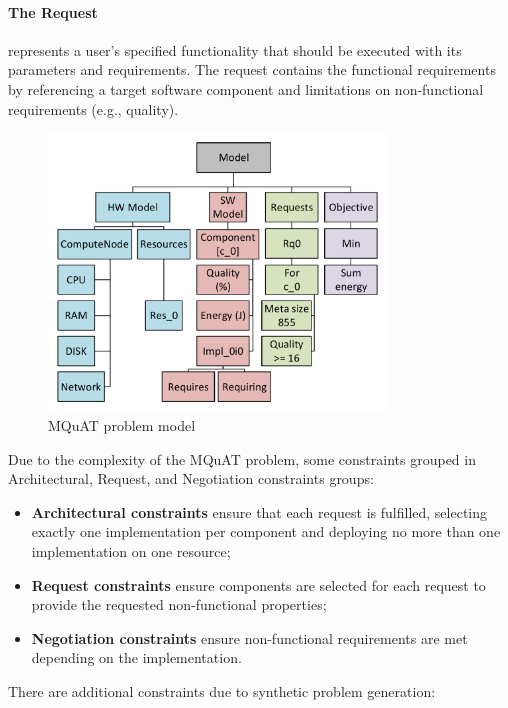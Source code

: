 \paragraph{The Request} represents a user's specified functionality that should be executed with its parameters and requirements.  The request contains the functional requirements by referencing a target software component and limitations on non-functional requirements (e.g., quality).\\


\begin{figure}
	\centering
	\includegraphics[width=0.8\textwidth]{images/MQuATModel.pdf}
	\caption[MQuAT problem model]{MQuAT problem model}
	\label{fig:mquatmodel}
\end{figure}


Due to the complexity of the MQuAT problem, some constraints grouped in Architectural, Request, and Negotiation constraints groups:

\begin{itemize}
	\item \textbf{Architectural constraints} ensure that each request is fulfilled, selecting exactly one implementation per component and deploying no more than one implementation on one resource;
	\item \textbf{Request constraints} ensure components are selected for each request to provide the requested non-functional properties;
	\item \textbf{Negotiation constraints} ensure non-functional requirements are met depending on the implementation.
\end{itemize}

There are additional constraints due to synthetic problem generation:

